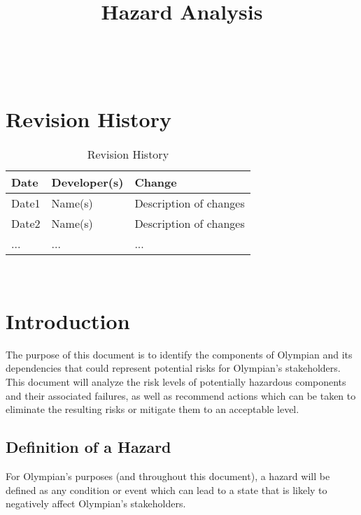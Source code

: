 \documentclass{article}
\title{Hazard Analysis\\\progname}
\author{\authname}
\date{}
\begin{document}
	
	\maketitle
	\thispagestyle{empty}
	
	~\newpage
	

	\tableofcontents

	\newpage

	\section{Revision History}
	
	\begin{table}[hp]
		\caption{Revision History} \label{TblRevisionHistory}
		\begin{tabularx}{\textwidth}{llX}
			\toprule
			\textbf{Date} & \textbf{Developer(s)} & \textbf{Change}\\
			\midrule
			Date1 & Name(s) & Description of changes\\
			Date2 & Name(s) & Description of changes\\
			... & ... & ...\\
			\bottomrule
		\end{tabularx}
	\end{table}
	
	~\newpage
	
	
	\section{Introduction}
	
	The purpose of this document is to identify the components of Olympian and its dependencies that could represent potential risks for Olympian's stakeholders. This document will analyze the risk levels of potentially hazardous components and their associated failures, as well as recommend actions which can be taken to eliminate the resulting risks or mitigate them to an acceptable level.
	
	\subsection{Definition of a Hazard}
	For Olympian's purposes (and throughout this document), a hazard will be defined as any condition or event which can lead to a state that is likely to negatively affect Olympian's stakeholders.
	
\end{document}
